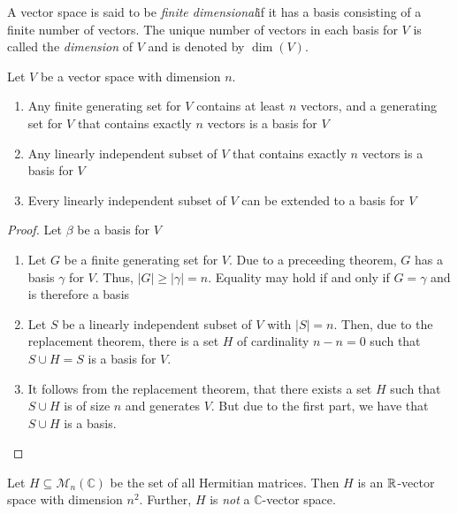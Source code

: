 \begin{definition}[Dimension]
    A vector space is said to be \textit{finite dimensional}if it has a basis consisting of a finite number of vectors. The unique number of vectors in each basis for $V$ is called the \textit{dimension} of $V$ and is denoted by $\dim(V)$.
\end{definition}

\begin{corollary}
    Let $V$ be a vector space with dimension $n$.
    \begin{enumerate}
        \item Any finite generating set for $V$ contains at least $n$ vectors, and a generating set for $V$ that contains exactly $n$ vectors is a basis for $V$ 
        \item Any linearly independent subset of $V$ that contains exactly $n$ vectors is a basis for $V$ 
        \item Every linearly independent subset of $V$ can be extended to a basis for $V$
    \end{enumerate}
\end{corollary}
\begin{proof}
    Let $\beta$ be a basis for $V$ 
    \begin{enumerate}
        \item Let $G$ be a finite generating set for $V$. Due to a preceeding theorem, $G$ has a basis $\gamma$ for $V$. Thus, $|G|\ge|\gamma| = n$. Equality may hold if and only if $G = \gamma$ and is therefore a basis 
        \item Let $S$ be a linearly independent subset of $V$ with $|S| = n$. Then, due to the replacement theorem, there is a set $H$ of cardinality $n - n = 0$ such that $S\cup H = S$ is a basis for $V$.
        \item It follows from the replacement theorem, that there exists a set $H$ such that $S\cup H$ is of size $n$ and generates $V$. But due to the first part, we have that $S\cup H$ is a basis.
    \end{enumerate}
\end{proof}

\begin{example}
    Let $H\subseteq\mathcal{M}_n(\mathbb{C})$ be the set of all Hermitian matrices. Then $H$ is an $\mathbb{R}$-vector space with dimension $n^2$. Further, $H$ is \textit{not} a $\mathbb{C}$-vector space.
\end{example}


